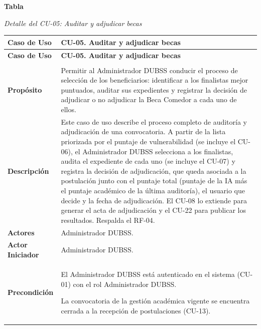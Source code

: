 \label{tab:detalle_cu05}
\noindent\textbf{Tabla~\thetable}\par\nopagebreak
\noindent\textit{Detalle del CU-05: Auditar y adjudicar becas}\par\nopagebreak
\begingroup\small\linespread{1}\selectfont
\begin{longtable}{>{\raggedright\arraybackslash}p{2.9cm} >{\raggedright\arraybackslash}p{12.6cm}}
\toprule
\textbf{Caso de Uso} & \textbf{CU-05. Auditar y adjudicar becas} \\
\midrule
\endfirsthead
\toprule
\textbf{Caso de Uso} & \textbf{CU-05. Auditar y adjudicar becas} \\
\midrule
\endhead
\endfoot
\bottomrule
\multicolumn{2}{l}{\textit{Nota.} Elaboración propia.} \\
\endlastfoot
\textbf{Propósito} & Permitir al Administrador DUBSS conducir el proceso de selección de los beneficiarios: identificar a los finalistas mejor puntuados, auditar sus expedientes y registrar la decisión de adjudicar o no adjudicar la Beca Comedor a cada uno de ellos. \\
\midrule
\textbf{Descripción} & Este caso de uso describe el proceso completo de auditoría y adjudicación de una convocatoria. A partir de la lista priorizada por el puntaje de vulnerabilidad (se incluye el CU-06), el Administrador DUBSS selecciona a los finalistas, audita el expediente de cada uno (se incluye el CU-07) y registra la decisión de adjudicación, que queda asociada a la postulación junto con el puntaje total (puntaje de la IA más el puntaje académico de la última auditoría), el usuario que decide y la fecha de adjudicación. El CU-08 lo extiende para generar el acta de adjudicación y el CU-22 para publicar los resultados. Respalda el RF-04. \\
\midrule
\textbf{Actores} & Administrador DUBSS. \\
\midrule
\textbf{Actor Iniciador} & Administrador DUBSS. \\
\midrule
\textbf{Precondición} & \vspace{-\baselineskip}\begin{cuvin}
    \item El Administrador DUBSS está autenticado en el sistema (CU-01) con el rol Administrador DUBSS.
    \item La convocatoria de la gestión académica vigente se encuentra cerrada a la recepción de postulaciones (CU-13).

\end{cuvin}
\end{longtable}

